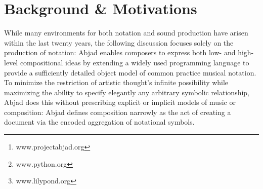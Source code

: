 \documentclass{article}
\title{\papertitle}
\begin{document}
\capstartfalse
\maketitle
\capstarttrue

\begin{abstract}
Abjad\footnote{www.projectabjad.org} is an interactive open-source software
system designed to help composers build up complex pieces of music notation in
an iterative and incremental way.  Abjad is implemented in the
Python\footnote{www.python.org} programming language and architected as an
object-oriented collection of packages, classes and functions. Composers can
visualize their work as publication-quality score at all stages of the
compositional process using Abjad's interface to the
LilyPond\footnote{www.lilypond.org} music notation package. Although the first
versions of Abjad were implemented in 1997 and the project website is now
visited thousands of times each month, we have never documented the design
priorities that have guided us as we have built the system. In this paper we
detail some of the most important principles we have followed in our work
architecting Abjad. The priorities we document here arise in answer to
domain-specific questions of music modeling (what are the fundamental elements
of music notation? which elements of music notation should be modeled
hierarchically? which programming constructs are available to help model the
temporal relationships arising between entities in musical score?) as well as
in consideration of the ways in which best practices taken from software
engineering can apply to the development of a music software system like ours
(which programming concepts concerning things like iteration, aggregation and
encapsulation make sense to make available to composers? which existing tools
to test, document and deploy other open-source projects are available to help
develop a music software system like Abjad?). In the sections that follow we
discuss the background and motivations that lead us to ask questions like these
and then elaborate the design priorities we have arrived at in our ongoing work
architecting Abjad.
\end{abstract}

\section{Background \& Motivations}\label{sec:background}

While many environments for both notation and sound production have arisen
within the last twenty years, the following discussion focuses solely on the
production of notation: Abjad enables composers to express both low- and
high-level compositional ideas by extending a widely used programming language
to provide a sufficiently detailed object model of common practice musical
notation. To minimize the restriction of artistic thought's infinite
possibility while maximizing the ability to specify elegantly any arbitrary
symbolic relationship, Abjad does this without prescribing explicit or implicit
models of music or composition: Abjad defines composition narrowly as the act
of creating a document via the encoded aggregation of notational symbols.
\end{document}
